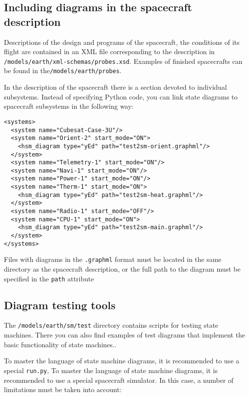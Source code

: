 \documentclass[12pt,a4paper]{article}
\begin{document}
\subsection*{Including diagrams in the spacecraft description}

Descriptions of the design and programs of the spacecraft, the conditions of its flight are contained in an XML file corresponding to the description in \verb'/models/earth/xml-schemas/probes.xsd'. Examples of finished spacecrafts can be found in the\verb'/models/earth/probes'.

In the description of the spacecraft there is a section devoted to individual subsystems. Instead of specifying Python code, you can link state diagrams to spacecraft subsystems in the following way:

\begin{verbatim}
<systems>
  <system name="Cubesat-Case-3U"/>
  <system name="Orient-2" start_mode="ON">
    <hsm_diagram type="yEd" path="test2sm-orient.graphml"/>
  </system>
  <system name="Telemetry-1" start_mode="ON"/>
  <system name="Navi-1" start_mode="ON"/>
  <system name="Power-1" start_mode="ON"/>
  <system name="Therm-1" start_mode="ON">
    <hsm_diagram type="yEd" path="test2sm-heat.graphml"/>
  </system>
  <system name="Radio-1" start_mode="OFF"/>
  <system name="CPU-1" start_mode="ON">
    <hsm_diagram type="yEd" path="test2sm-main.graphml"/>
  </system>
</systems>
\end{verbatim}

Files with diagrams in the \verb'.graphml' format must be located in the same directory as the spacecraft description, or the full path to the diagram must be specified in the \verb'path' attribute

\subsection*{Diagram testing tools}

The \verb'/models/earth/sm/test' directory contains scripts for testing state machines. There you can also find examples of test diagrams that implement the basic functionality of state machines..

To master the language of state machine diagrams, it is recommended to use a special \verb'run.py', To master the language of state machine diagrams, it is recommended to use a special spacecraft simulator. In this case, a number of limitations must be taken into account:
\end{document}
